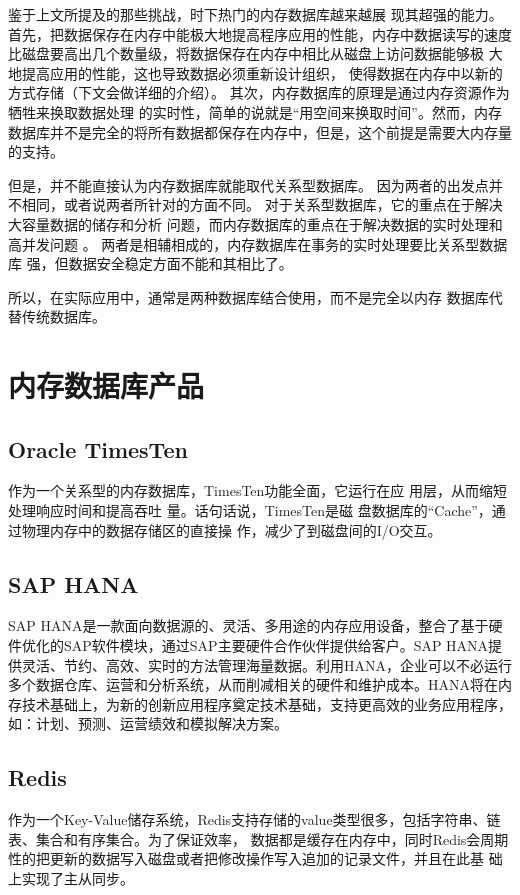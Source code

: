 \documentclass{zjutthesis}
\begin{document}
鉴于上文所提及的那些挑战，时下热门的内存数据库越来越展
现其超强的能力。首先，把数据保存在内存中能极大地提高程序应用的性能，内存中数据读写的速度比磁盘要高出几个数量级，将数据保存在内存中相比从磁盘上访问数据能够极
大地提高应用的性能\cite{徐海华2008面向应用的内存数据库研究}，这也导致数据必须重新设计组织，
使得数据在内存中以新的方式存储（下文会做详细的介绍）。
其次，内存数据库的原理是通过内存资源作为牺牲来换取数据处理
的实时性，简单的说就是“用空间来换取时间”。然而，内存数据库并不是完全的将所有数据都保存在内存中，但是，这个前提是需要大内存量的支持。

但是，并不能直接认为内存数据库就能取代关系型数据库。
因为两者的出发点并不相同，或者说两者所针对的方面不同。
对于关系型数据库，它的重点在于解决大容量数据的储存和分析
问题，而内存数据库的重点在于解决数据的实时处理和高并发问题
\cite{周游弋2011高并发集群监控系统中内存数据库的设计与应用}。
两者是相辅相成的，内存数据库在事务的实时处理要比关系型数据库
强，但数据安全稳定方面不能和其相比了。

所以，在实际应用中\cite{郑宗苗2013基于移动定位的云平台方案的研究与实现}，通常是两种数据库结合使用，而不是完全以内存
数据库代替传统数据库。

\section{内存数据库产品}
\subsection{Oracle TimesTen}
作为一个关系型的内存数据库，TimesTen\cite{bworld}功能全面，它运行在应
用层，从而缩短处理响应时间和提高吞吐
量。话句话说，TimesTen是磁
盘数据库的“Cache”，通过物理内存中的数据存储区的直接操
作，减少了到磁盘间的I/O交互。

\subsection{SAP HANA}
SAP HANA\cite{farber2012sap}是一款面向数据源的、灵活、多用途的内存应用设备，整合了基于硬件优化的SAP软件模块，通过SAP主要硬件合作伙伴提供给客户。SAP HANA提供灵活、节约、高效、实时的方法管理海量数据。利用HANA，企业可以不必运行多个数据仓库、运营和分析系统，从而削减相关的硬件和维护成本。HANA将在内存技术基础上，为新的创新应用程序奠定技术基础，支持更高效的业务应用程序，如：计划、预测、运营绩效和模拟解决方案。

\subsection{Redis}
作为一个Key-Value储存系统，Redis\cite{web:Redis}支持存储的value类型很多，包括字符串、链表、集合和有序集合。为了保证效率，
数据都是缓存在内存中，同时Redis会周期性的把更新的数据写入磁盘或者把修改操作写入追加的记录文件，并且在此基
础上实现了主从同步。
\end{document}
